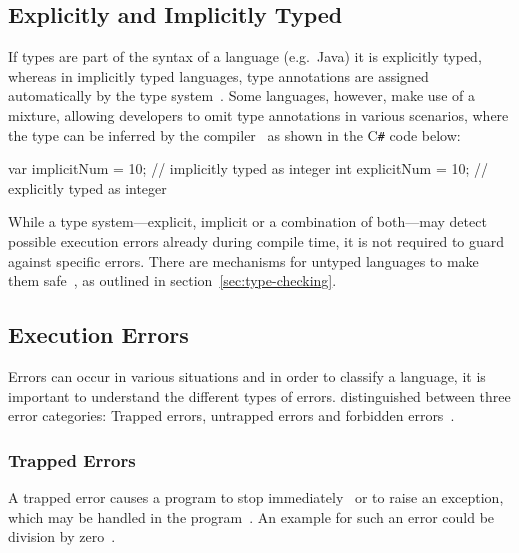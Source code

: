 
\subsection{Explicitly and Implicitly Typed}
\label{sec:explicitly-implicitly-typed}

If types are part of the syntax of a language (e.g.\ Java) it is explicitly typed, whereas in implicitly typed languages, type annotations are assigned automatically by the type system~\cite[pp.~2--3]{TypeSystems:Cardelli:2004}. Some languages, however, make use of a mixture, allowing developers to omit type annotations in various scenarios, where the type can be inferred by the compiler~\cite[p.~10]{TypesAndProgrammingLanguages:Pierce:2002} as shown in the C\texttt{\#} code below:
\begin{CsCode}[numbers=none]
var implicitNum = 10; // implicitly typed as integer
int explicitNum = 10; // explicitly typed as integer
\end{CsCode}
While a type system---explicit, implicit or a combination of both---may detect possible execution errors already during compile time, it is not required to guard against specific errors. There are mechanisms for untyped languages to make them safe~\cite[p.~3]{TypeSystems:Cardelli:2004}, as outlined in section~\ref{sec:type-checking}.

\subsection{Execution Errors}
\label{sec:execution-errors}
Errors can occur in various situations and in order to classify a language, it is important to understand the different types of errors. \citeauthor{TypeSystems:Cardelli:2004} distinguished between three error categories: Trapped errors, untrapped errors and forbidden errors~\cite[p.~3]{TypeSystems:Cardelli:2004}.

\subsubsection{Trapped Errors}

A trapped error causes a program to stop immediately~\cite[p.~3]{TypeSystems:Cardelli:2004} or to raise an exception, which may be handled in the program~\cite[p.~7]{TypesAndProgrammingLanguages:Pierce:2002}. An example for such an error could be division by zero~\cite[p.~3]{TypeSystems:Cardelli:2004}.

